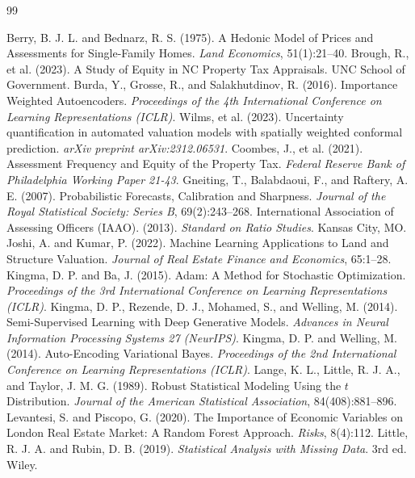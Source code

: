 \documentclass{article}
\begin{document}
\begin{thebibliography}{99}

 Berry, B. J. L. and Bednarz, R. S. (1975). A Hedonic Model of Prices and Assessments for Single-Family Homes. \textit{Land Economics}, 51(1):21--40.
     Brough, R., et al. (2023). A Study of Equity in NC Property Tax Appraisals. UNC School of Government.
     Burda, Y., Grosse, R., and Salakhutdinov, R. (2016). Importance Weighted Autoencoders. \textit{Proceedings of the 4th International Conference on Learning Representations (ICLR)}.
     Wilms, et al. (2023). Uncertainty quantification in automated valuation models with spatially weighted conformal prediction. \textit{arXiv preprint arXiv:2312.06531}.
     Coombes, J., et al. (2021). Assessment Frequency and Equity of the Property Tax. \textit{Federal Reserve Bank of Philadelphia Working Paper 21-43}.
     Gneiting, T., Balabdaoui, F., and Raftery, A. E. (2007). Probabilistic Forecasts, Calibration and Sharpness. \textit{Journal of the Royal Statistical Society: Series B}, 69(2):243--268.
     International Association of Assessing Officers (IAAO). (2013). \textit{Standard on Ratio Studies}. Kansas City, MO.
     Joshi, A. and Kumar, P. (2022). Machine Learning Applications to Land and Structure Valuation. \textit{Journal of Real Estate Finance and Economics}, 65:1--28.
     Kingma, D. P. and Ba, J. (2015). Adam: A Method for Stochastic Optimization. \textit{Proceedings of the 3rd International Conference on Learning Representations (ICLR)}.
     Kingma, D. P., Rezende, D. J., Mohamed, S., and Welling, M. (2014). Semi-Supervised Learning with Deep Generative Models. \textit{Advances in Neural Information Processing Systems 27 (NeurIPS)}.
     Kingma, D. P. and Welling, M. (2014). Auto-Encoding Variational Bayes. \textit{Proceedings of the 2nd International Conference on Learning Representations (ICLR)}.
     Lange, K. L., Little, R. J. A., and Taylor, J. M. G. (1989). Robust Statistical Modeling Using the $t$ Distribution. \textit{Journal of the American Statistical Association}, 84(408):881--896.
     Levantesi, S. and Piscopo, G. (2020). The Importance of Economic Variables on London Real Estate Market: A Random Forest Approach. \textit{Risks}, 8(4):112.
     Little, R. J. A. and Rubin, D. B. (2019). \textit{Statistical Analysis with Missing Data}. 3rd ed. Wiley.

\end{thebibliography}
\end{document}
